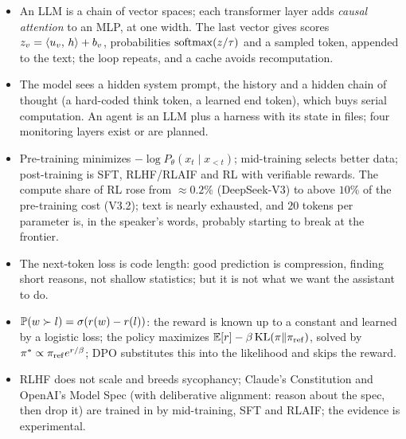 \begin{takeaways}
\begin{itemize}
  \item An LLM is a chain of vector spaces; each transformer layer adds \emph{causal attention} to an MLP, at one width. The last vector gives scores $z_v=\left\langle u_v,\,h\right\rangle+b_v$, probabilities $\operatorname{softmax}(z/\tau)$ and a sampled token, appended to the text; the loop repeats, and a cache avoids recomputation.
  \item The model sees a hidden system prompt, the history and a hidden chain of thought (a hard-coded think token, a learned end token), which buys serial computation. An agent is an LLM plus a harness with its state in files; four monitoring layers exist or are planned.
  \item Pre-training minimizes $-\log P_\theta(x_t\mid x_{<t})$; mid-training selects better data; post-training is SFT, RLHF/RLAIF and RL with verifiable rewards. The compute share of RL rose from $\approx0.2\%$ (DeepSeek-V3) to above $10\%$ of the pre-training cost (V3.2); text is nearly exhausted, and $20$ tokens per parameter is, in the speaker's words, probably starting to break at the frontier.
  \item The next-token loss is code length: good prediction is compression, finding short reasons, not shallow statistics; but it is not what we want the assistant to do.
  \item $\mathbb{P}(w\succ l)=\sigma(r(w)-r(l))$: the reward is known up to a constant and learned by a logistic loss; the policy maximizes $\mathbb{E}[r]-\beta\operatorname{KL}(\pi\|\pi_{\mathrm{ref}})$, solved by $\pi^*\propto\pi_{\mathrm{ref}} e^{r/\beta}$; DPO substitutes this into the likelihood and skips the reward.
  \item RLHF does not scale and breeds sycophancy; Claude's Constitution and OpenAI's Model Spec (with deliberative alignment: reason about the spec, then drop it) are trained in by mid-training, SFT and RLAIF; the evidence is experimental.
\end{itemize}
\end{takeaways}


